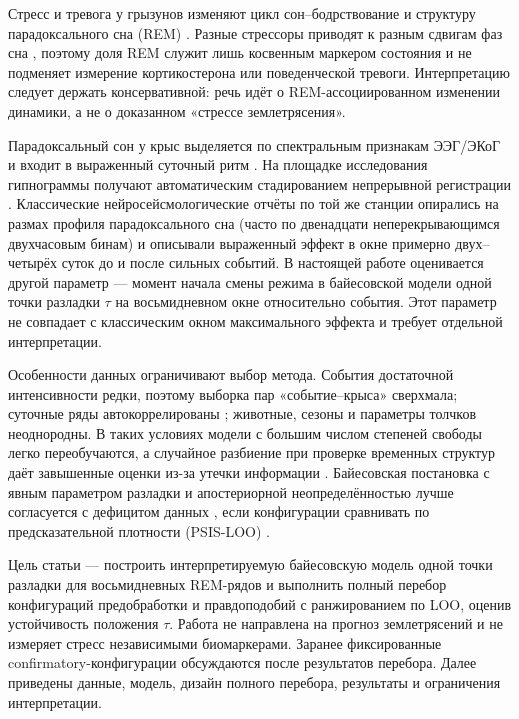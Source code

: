 \documentclass{article}
\begin{document}
Стресс и тревога у грызунов изменяют цикл сон–бодрствование и структуру парадоксального сна (REM) \cite{Rampin1991,Meerlo1997,Palma2000,Sanford2010}. Разные стрессоры приводят к разным сдвигам фаз сна \cite{Rampin1991,Meerlo1997,Palma2000}, поэтому доля REM служит лишь косвенным маркером состояния и не подменяет измерение кортикостерона или поведенческой тревоги. Интерпретацию следует держать консервативной: речь идёт о REM-ассоциированном изменении динамики, а не о доказанном «стрессе землетрясения».

Парадоксальный сон у крыс выделяется по спектральным признакам ЭЭГ/ЭКоГ и входит в выраженный суточный ритм \cite{Fang2010,Saevskiy2025}. На площадке исследования гипнограммы получают автоматическим стадированием непрерывной регистрации \cite{Saevskiy2025}. Классические нейросейсмологические отчёты по той же станции опирались на размах профиля парадоксального сна (часто по двенадцати неперекрывающимся двухчасовым бинам) и описывали выраженный эффект в окне примерно двух–четырёх суток до и после сильных событий. В настоящей работе оценивается другой параметр — момент начала смены режима в байесовской модели одной точки разладки \(\tau\) на восьмидневном окне относительно события. Этот параметр не совпадает с классическим окном максимального эффекта и требует отдельной интерпретации.

Особенности данных ограничивают выбор метода. События достаточной интенсивности редки, поэтому выборка пар «событие–крыса» сверхмала; суточные ряды автокоррелированы \cite{Hyndman2018}; животные, сезоны и параметры толчков неоднородны. В таких условиях модели с большим числом степеней свободы легко переобучаются, а случайное разбиение при проверке временных структур даёт завышенные оценки из-за утечки информации \cite{Bergmeir2012}. Байесовская постановка с явным параметром разладки и апостериорной неопределённостью лучше согласуется с дефицитом данных \cite{Sinkovec2022}, если конфигурации сравнивать по предсказательной плотности (PSIS-LOO) \cite{Vehtari2017}.

Цель статьи — построить интерпретируемую байесовскую модель одной точки разладки для восьмидневных REM-рядов и выполнить полный перебор конфигураций предобработки и правдоподобий с ранжированием по LOO, оценив устойчивость положения \(\tau\). Работа не направлена на прогноз землетрясений \cite{Geller1997} и не измеряет стресс независимыми биомаркерами. Заранее фиксированные confirmatory-конфигурации обсуждаются после результатов перебора. Далее приведены данные, модель, дизайн полного перебора, результаты и ограничения интерпретации.
\end{document}
